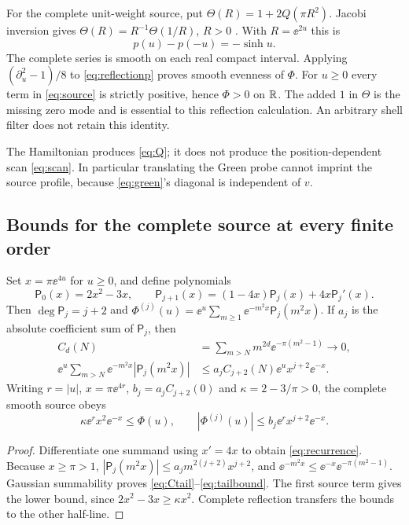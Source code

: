 For the complete unit-weight source, put
$\Theta(R)=1+2Q(\pi R^2)$. Jacobi inversion gives
$\Theta(R)=R^{-1}\Theta(1/R)$, $R>0$
\cite[20.7.32, at zero argument]{DLMFThetaModular}.
With $R=\ee^{2u}$ this is
\begin{equation}\label{eq:reflectionp}
 p(u)-p(-u)=-\sinh u.
\end{equation}
The complete series is smooth on each real compact interval. Applying
$(\partial_u^2-1)/8$ to \eqref{eq:reflectionp} proves smooth evenness
of $\Phi$. For $u\ge0$ every term in \eqref{eq:source} is strictly
positive, hence $\Phi>0$ on $\mathbb R$. The added $1$ in $\Theta$ is the
missing zero mode and is essential to this reflection calculation.
An arbitrary shell filter does not retain this identity.

The Hamiltonian produces \eqref{eq:Q}; it does not produce the
position-dependent scan \eqref{eq:scan}. In particular translating the
Green probe cannot imprint the source profile, because
\eqref{eq:green}'s diagonal is independent of $v$.

\subsection{Bounds for the complete source at every finite order}
\begin{lemma}\label{lem:tails}
Set $x=\pi\ee^{4u}$ for $u\ge0$, and define polynomials
\begin{equation}\label{eq:recurrence}
 \mathsf P_0(x)=2x^2-3x,\qquad
 \mathsf P_{j+1}(x)=(1-4x)\mathsf P_j(x)+4x\mathsf P_j'(x).
\end{equation}
Then $\deg \mathsf P_j=j+2$ and
$\Phi^{(j)}(u)=\ee^u\sum_{m\ge1}\ee^{-m^2x}\mathsf P_j(m^2x)$.
If $a_j$ is the absolute coefficient sum of $\mathsf P_j$, then
\begin{align}
 C_d(N)&=\sum_{m>N}m^{2d}\ee^{-\pi(m^2-1)}\longrightarrow0,\label{eq:Ctail}\\
 \ee^u\sum_{m>N}\ee^{-m^2x}|\mathsf P_j(m^2x)|
 &\le a_j C_{j+2}(N)\ee^u x^{j+2}\ee^{-x}.
 \label{eq:tailbound}
\end{align}
Writing $r=|u|$, $x=\pi\ee^{4r}$, $b_j=a_jC_{j+2}(0)$ and
$\kappa=2-3/\pi>0$, the complete smooth source obeys
\begin{equation}\label{eq:twosidedbounds}
 \kappa\ee^r x^2\ee^{-x}\le\Phi(u),\qquad
 |\Phi^{(j)}(u)|\le b_j\ee^r x^{j+2}\ee^{-x}.
\end{equation}
\end{lemma}
\begin{proof}
Differentiate one summand using $x'=4x$ to obtain
\eqref{eq:recurrence}. Because $x\ge\pi>1$,
$|\mathsf P_j(m^2x)|\le a_jm^{2(j+2)}x^{j+2}$, and
$\ee^{-m^2x}\le\ee^{-x}\ee^{-\pi(m^2-1)}$.
Gaussian summability proves \eqref{eq:Ctail}--\eqref{eq:tailbound}.
The first source term gives the lower bound, since
$2x^2-3x\ge\kappa x^2$.
Complete reflection transfers the bounds to the other half-line.
\end{proof}

